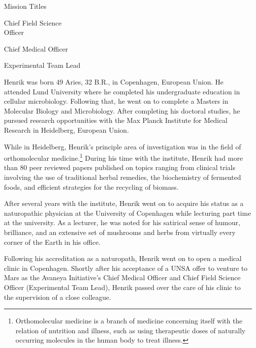 {        \bTR
            \bTC Mission Titles \eTC
            \bTC 
                \startitemize[4]
                \startpacked
                \item Chief Field Science\\Officer
                \item Chief Medical Officer
                \item Experimental Team Lead
                \stoppacked
                \stopitemize
            \eTC
        \eTR
    \eTABLEbody

\eTABLE
}

Henrik was born 49 Aries, 32 B.R., in Copenhagen, European Union. He attended Lund University where he completed his undergraduate education in cellular microbiology. Following that, he went on to complete a Masters in Molecular Biology and Microbiology. After completing his doctoral studies, he pursued research opportunities with the Max Planck Institute for Medical Research in Heidelberg, European Union.

While in Heidelberg, Henrik's principle area of investigation was in the field of orthomolecular medicine.\footnote{Orthomolecular medicine is a branch of medicine concerning itself with the relation of nutrition and illness, such as using therapeutic doses of naturally occurring molecules in the human body to treat illness.} During his time with the institute, Henrik had more than 80 peer reviewed papers published on topics ranging from clinical trials involving the use of traditional herbal remedies, the biochemistry of fermented foods, and efficient strategies for the recycling of biomass.

After several years with the institute, Henrik went on to acquire his status as a naturopathic physician at the University of Copenhagen while lecturing part time at the university. As a lecturer, he was noted for his satirical sense of humour, brilliance, and an extensive set of mushrooms and herbs from virtually every corner of the Earth in his office.

Following his accreditation as a naturopath, Henrik went on to open a medical clinic in Copenhagen. Shortly after his acceptance of a UNSA offer to venture to Mars as the Avaneya Initiative's Chief Medical Officer and Chief Field Science Officer (Experimental Team Lead), Henrik passed over the care of his clinic to the supervision of a close colleague.

